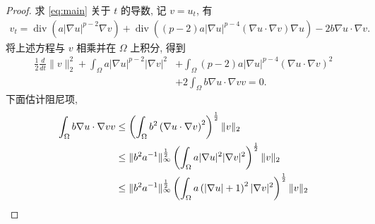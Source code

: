 \documentclass[oneside,longtitle]{LZUthesis}
\theoremstyle{definition}
\newtheorem{proofpart}{part}
\numberwithin{equation}{chapter}
\newcommand*\abs[1]{\lvert#1\rvert}
\newcommand*\norm[1]{\lVert#1\rVert}
\newcommand*\Brace[1]{\lbrace#1\rbrace}
\newcommand\R{\mathbb{R}}
\DeclareMathOperator{\Div}{div}
\begin{document}
\begin{proof}
	求 \cref{eq:main} 关于 $t$ 的导数, 记 $v = u_t$, 有
	\begin{equation}
		\begin{split}
			v_t
			= \Div\left(a\abs{\nabla u}^{p-2}\nabla v\right)
			+ \Div\left(\left(p-2\right)a \abs{\nabla u}^{p-4}\left(\nabla u \cdot \nabla v\right)\nabla u\right)
			- 2b\nabla u \cdot \nabla v.
		\end{split}
	\end{equation}
	将上述方程与 $v$ 相乘并在 $\Omega$ 上积分, 得到
	\begin{equation}
		\begin{split}
			\frac{1}{2}\frac{d}{dt}\norm{v}_2^2
			+ \int_{\Omega}a\abs{\nabla u}^{p-2}\abs{\nabla v}^2
			&+ \int_{\Omega}\left(p-2\right)a\abs{\nabla u}^{p-4}\left(\nabla u
			\cdot \nabla v\right)^2\\
			&+ 2\int_{\Omega}b\nabla u \cdot \nabla v v
			= 0.
		\end{split}
	\end{equation}
	下面估计阻尼项,
	\begin{equation}
		\begin{split}
			\int_{\Omega}b\nabla u \cdot \nabla v v
			&\leq \left(\int_{\Omega}b^2\left(\nabla u
			\cdot \nabla v\right)^2\right)^{\frac{1}{2}}
			\*\norm{v}_2\\
			&\leq \norm{b^2 a^{-1}}_{\infty}^{\frac{1}{2}}
			\left(\int_{\Omega}a\abs{\nabla u}^2\abs{\nabla v}^2\right)^{\frac{1}{2}}\norm{v}_2\\
			&\leq \norm{b^2 a^{-1}}_{\infty}^{\frac{1}{2}}
			\left(\int_{\Omega}a\left(\abs{\nabla u}+1\right)^2\abs{\nabla v}^2\right)^{\frac{1}{2}}\norm{v}_2\\

\end{split}
\end{equation}
\end{proof}
\end{document}

